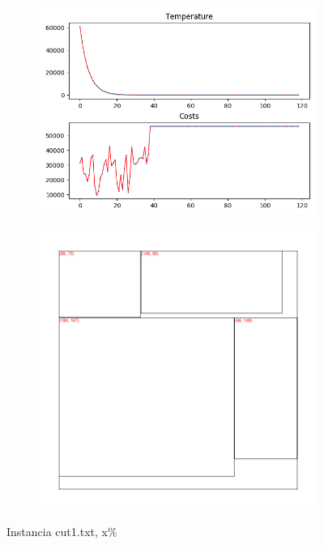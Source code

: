 \begin{figure}
\centering
\begin{subfigure}{.5\textwidth}
  \centering
  \includegraphics[width=1\linewidth]{results/cut1/1/plot}
  \label{fig:sub1}
\end{subfigure}%
\begin{subfigure}{.5\textwidth}
  \centering
  \includegraphics[width=1\linewidth]{results/cut1/1/cut}
  \label{fig:sub2}
\end{subfigure}
\caption{Instancia cut1.txt, x\%}
\label{fig:test}
\end{figure}


